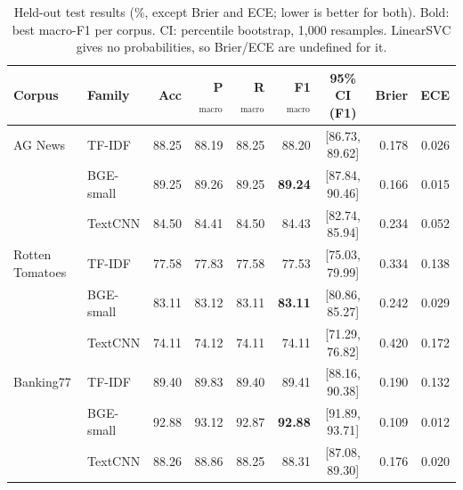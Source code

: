 \begin{table}[H]
\centering
\footnotesize
\caption{Held-out test results (\%, except Brier and ECE; lower is better for both). Bold: best macro-F1 per corpus. CI: percentile bootstrap, 1{,}000 resamples. LinearSVC gives no probabilities, so Brier/ECE are undefined for it.}\label{tab:main}
\begin{tabular}{@{}llrrrrcrr@{}}
\toprule
Corpus & Family & Acc & P$_{\text{macro}}$ & R$_{\text{macro}}$ & F1$_{\text{macro}}$ & 95\% CI (F1) & Brier & ECE \\
\midrule
AG News & TF-IDF & 88.25 & 88.19 & 88.25 & 88.20 & [86.73, 89.62] & 0.178 & 0.026 \\
 & BGE-small & 89.25 & 89.26 & 89.25 & \textbf{89.24} & [87.84, 90.46] & 0.166 & 0.015 \\
 & TextCNN & 84.50 & 84.41 & 84.50 & 84.43 & [82.74, 85.94] & 0.234 & 0.052 \\
\midrule
Rotten Tomatoes & TF-IDF & 77.58 & 77.83 & 77.58 & 77.53 & [75.03, 79.99] & 0.334 & 0.138 \\
 & BGE-small & 83.11 & 83.12 & 83.11 & \textbf{83.11} & [80.86, 85.27] & 0.242 & 0.029 \\
 & TextCNN & 74.11 & 74.12 & 74.11 & 74.11 & [71.29, 76.82] & 0.420 & 0.172 \\
\midrule
Banking77 & TF-IDF & 89.40 & 89.83 & 89.40 & 89.41 & [88.16, 90.38] & 0.190 & 0.132 \\
 & BGE-small & 92.88 & 93.12 & 92.87 & \textbf{92.88} & [91.89, 93.71] & 0.109 & 0.012 \\
 & TextCNN & 88.26 & 88.86 & 88.25 & 88.31 & [87.08, 89.30] & 0.176 & 0.020 \\
\bottomrule
\end{tabular}
\end{table}

